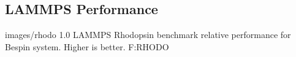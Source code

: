 





\subsection{LAMMPS Performance}

  {images/rhodo}
  {1.0}
  {LAMMPS Rhodopsin benchmark relative performance for Bespin system.  Higher is better.}
  {F:RHODO} 


